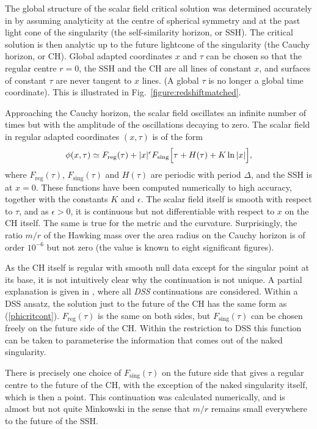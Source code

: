 \documentclass{article}
\begin{document}
The global structure of the scalar field critical solution was
determined accurately in \cite{critcont} by assuming analyticity at
the centre of spherical symmetry and at the past light cone of the
singularity (the self-similarity horizon, or SSH). The critical
solution is then analytic up to the future lightcone of the
singularity (the Cauchy horizon, or CH). Global adapted coordinates
$x$ and $\tau$ can be chosen so that the regular centre $r=0$, the SSH
and the CH are all lines of constant $x$, and surfaces of constant
$\tau$ are never tangent to $x$ lines. (A global $\tau$ is no longer a global
time coordinate). This is illustrated in
Fig.~\ref{figure:redshiftmatched}.

Approaching the Cauchy horizon, the scalar field oscillates an
infinite number of times but with the amplitude of the oscillations
decaying to zero. The scalar
field in regular adapted coordinates $(x,\tau)$ is of the form
\begin{equation}
\label{phicritcont}
\phi(x,\tau)\simeq F_\mathrm{reg}(\tau)
+|x|^\epsilon F_\mathrm{sing}\Bigl[
\tau+H(\tau)+K\ln|x|\Bigr],
\end{equation}
where $F_\mathrm{reg}(\tau)$, $F_\mathrm{sing}(\tau)$ and $H(\tau)$
are periodic with period $\Delta$, and the SSH is at $x=0$. These
functions have been computed numerically to high accuracy, together
with the constants $K$ and $\epsilon$. The scalar
field itself is smooth with respect to $\tau$, and as $\epsilon>0$, it
is continuous but not
differentiable with respect to $x$ on the CH itself. The same is true
for the metric and the curvature. Surprisingly, the ratio $m/r$
of the Hawking mass over the area radius on the Cauchy horizon is of
order $10^{-6}$ but not zero (the value is known to eight significant
figures). 

As the CH itself is regular with smooth null data except for the
singular point at its base, it is not intuitively clear why the
continuation is not unique. A partial explanation is given in
\cite{critcont}, where all {\em DSS} continuations are considered.
Within a DSS ansatz, the solution just to the future of the CH has the
same form as (\ref{phicritcont}).  $F_\mathrm{reg}(\tau)$ is the same
on both sides, but $F_\mathrm{sing}(\tau)$ can be chosen freely on the
future side of the CH. Within the restriction to DSS this function can
be taken to parameterise the information that comes out of the naked
singularity.

There is precisely one choice of $F_\mathrm{sing}(\tau)$ on the future
side that gives a regular centre to the future of the CH, with the
exception of the naked singularity itself, which is then a point. This
continuation was calculated numerically, and is almost but not quite
Minkowski in the sense that $m/r$ remains small everywhere to the
future of the SSH. 
\end{document}
